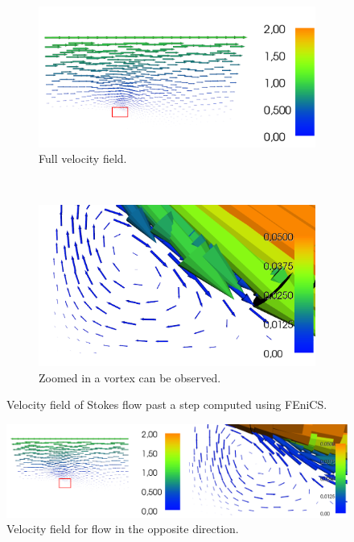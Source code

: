 \documentclass[11pt,a4paper,english]{article}
\numberwithin{equation}{section}
\begin{document}
\begin{figure}[t!]
    \centering
    \begin{subfigure}[b]{0.5\textwidth}
        \centering
        \includegraphics[scale=0.21]{vel_step1.png}
        \caption{Full velocity field.}
    \end{subfigure}%
    ~ 
    \begin{subfigure}[b]{0.5\textwidth} 
        \centering
        \includegraphics[scale=0.14]{vel_step2.png}
        \caption{Zoomed in a vortex can be observed.}
    \end{subfigure}
    \caption{Velocity field of Stokes flow past a step computed using FEniCS.}
\end{figure}


\vspace{1.5cm}
\begin{figure}[h!]
\begin{center}
  \includegraphics[scale=0.25]{reverse_velstep.png}
  \end{center}
  \caption{Velocity field for flow in the opposite direction.}
\end{figure}
\end{document}

